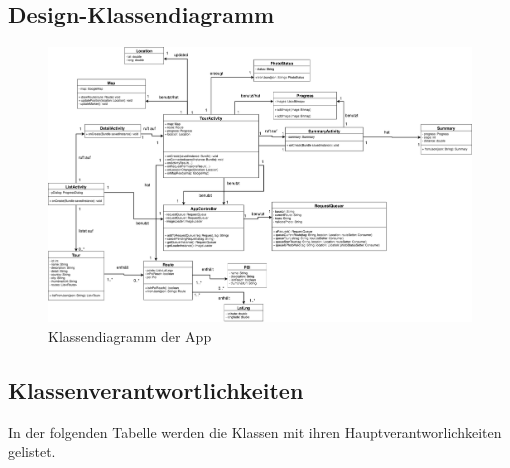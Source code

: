 \documentclass[a4paper,10pt,xetex]{article}
\begin{document}
\subsection{Design-Klassendiagramm}\label{design-klassendiagram}
\begin{figure}
  \includegraphics{classdiagram_frontend}
  \caption{Klassendiagramm der App}
\end{figure}

\newpage
\subsection{Klassenverantwortlichkeiten}\label{klassenverantwortlichkeiten}
In der folgenden Tabelle werden die Klassen mit ihren Hauptverantworlichkeiten
gelistet.
\end{document}
